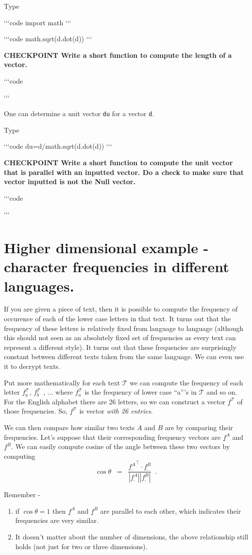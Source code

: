 \documentclass[11pt]{amsart}
\renewcommand{\v}[1]{\underline{#1}}
\newcommand{\length}[1]{|\v{#1}|}
\renewcommand{\dot}[2]{{\v{#1}^\intercal} \cdot {\v{#2}}}
\newcommand{\cli}[1]{`{}`{}`{}code
#1 
`{}`{}`{}}
\newcommand{\checkpoint}[1]{{\bf CHECKPOINT \newline #1 \newline} 

`{}`{}`{}code
 
`{}`{}`{}
}
\begin{document}
Type 

\cli{import math}

\cli{math.sqrt(d.dot(d))}


\checkpoint{Write a short function to compute the length of a vector.}

One can determine a unit vector {\tt du} for a vector {\tt d}.

Type 

\cli{du=d/math.sqrt(d.dot(d))}

\checkpoint{Write a short function to compute the unit vector that is 
parallel with an inputted vector. Do a check to make sure that 
vector inputted is not the Null vector.}


\section{Higher dimensional example - character frequencies in different languages.}

If you are given a piece of text, then it is possible to compute the frequency of occurence of each of the lower case letters in that text. It turns out that the frequency of these letters is relatively fixed from language to language (although this should not seen as an absolutely fixed set of frequencies as every text can represent a different style). It turns out that these frequencies are surprisingly constant between 
different texts taken from the same language. We can even use it to  
decrypt texts. 

Put more mathematically for  each text $\mathcal T$ we can compute
the frequency of each letter $f_a^{\mathcal T}$, $f_b^{\mathcal T}$ , $\dots$ where $f_a^{\mathcal T}$ is the frequency of lower case ``a'''s  in $\mathcal T$ and so on. For the English alphabet there are 26 letters, so we can construct a vector $\v{f}^{\mathcal T}$ of those frequencies. So, $\v{f}^{\mathcal T}$ is vector {\it with 26 entries}. 

We can then compare how similar two texts $A$ and $B$ are by comparing their frequencies. 
Let's suppose that their corresponding frequency vectors are $\v{f}^A$ and $\v{f}^B$. 
We can easily compute cosine of the angle between these two vectors by computing 
\begin{equation}
\cos \theta \;\; = \;\; \frac{\dot{f^A}{f^B}}{\length{f^A}\length{f^B}} \;\; .
\end{equation}
 
 Remember - 
 
\begin{enumerate}
\item if $\cos \theta = 1$ then $\v{f}^A$ and $\v{f}^B$ are parallel to each other, which indicates their
frequencies are very similar.
\item It doesn't matter about the number of dimensions, the above relationship still holds (not just for two or three dimensions). 
\end{enumerate}
\end{document}
